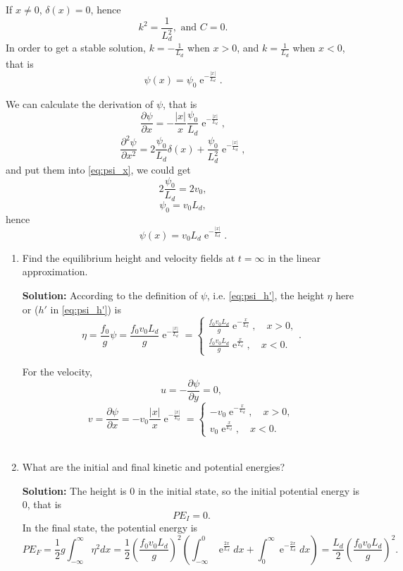 \documentclass[a4paper]{article}
\begin{document}
\begin{enumerate}[label=\textbf{\arabic*.}]
\begin{enumerate}[label=\textbf{(\alph*)}]
		If $x\neq 0$, $\delta(x)=0$, hence
		$$k^2=\frac{1}{L_d^2}, \text{ and } C=0.$$
		In order to get a stable solution, $k=-\frac{1}{L_d}$ when $x>0$, and $k=\frac{1}{L_d}$ when $x<0$, that is
		$$\psi(x) = \psi_0\operatorname{e}^{-\frac{|x|}{L_d}}.$$
		
		We can calculate the derivation of $\psi$, that is
		$$\frac{\partial \psi}{\partial x}=-\frac{|x|}{x}\frac{\psi_0}{L_d}\operatorname{e}^{-\frac{|x|}{L_d}},$$
		$$\frac{\partial^2 \psi}{\partial x^2}=2\frac{\psi_0}{L_d}\delta(x) +\frac{\psi_0}{L_d^2}\operatorname{e}^{-\frac{|x|}{L_d}},$$
		and put them into \eqref{eq:psi_x}, we could get
		$$2\frac{\psi_0}{L_d}=2v_0,$$
		$$\psi_0=v_0L_d,$$
		hence 
		\begin{equation}
			\psi(x) = v_0L_d\operatorname{e}^{-\frac{|x|}{L_d}}.
		\end{equation}
		
		\begin{enumerate}[label=(\roman*)]
			\setcounter{enumii}{0}
			\item Find the equilibrium height and velocity fields at $t=\infty$ in the linear approximation.
			
			\textbf{Solution:} According to the definition of $\psi$, i.e. \eqref{eq:psi_h'}, the height $\eta$ here or ($h'$ in \eqref{eq:psi_h'}) is 
			$$\eta = \frac{f_0}{g}\psi= \frac{f_0v_0L_d}{g}\operatorname{e}^{-\frac{|x|}{L_d}}=\left\{\begin{aligned}
			 \frac{f_0v_0L_d}{g}\operatorname{e}^{-\frac{x}{L_d}}, \quad x>0, \\
			 \frac{f_0v_0L_d}{g}\operatorname{e}^{\frac{x}{L_d}}, \quad x<0.
			\end{aligned}\right..$$
			
			For the velocity,
			$$u=-\frac{\partial \psi}{\partial y}=0,$$
			$$v=\frac{\partial \psi}{\partial x}=-v_0\frac{|x|}{x}\operatorname{e}^{-\frac{|x|}{L_d}}=\left\{\begin{aligned}
			-v_0\operatorname{e}^{-\frac{x}{L_d}}, \quad x>0, \\
			v_0\operatorname{e}^{\frac{x}{L_d}}, \quad x<0.
			\end{aligned}\right.$$\\
			\item  What are the initial and final kinetic and potential energies?
			
			\textbf{Solution:} The height is $0$ in the initial state, so the initial potential energy is $0$, that is $$PE_I = 0.$$In the final state, the potential energy is
			$$PE_F = \frac{1}{2}g\int_{-\infty}^{\infty}\eta^2dx=\frac{1}{2}\left(\frac{f_0v_0L_d}{g}\right)^2\left(\int_{-\infty}^{0}\operatorname{e}^{\frac{2x}{L_d}} dx +\int_{0}^{\infty}\operatorname{e}^{-\frac{2x}{L_d}}dx \right) =\frac{L_d}{2}\left(\frac{f_0v_0L_d}{g}\right)^2.$$
			

\end{enumerate}
\end{enumerate}
\end{enumerate}
\end{document}
